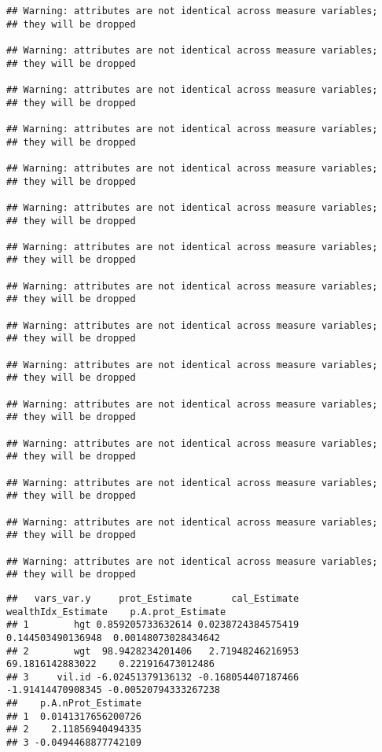 \documentclass[
]{book}
\begin{document}
\begin{verbatim}
## Warning: attributes are not identical across measure variables;
## they will be dropped

## Warning: attributes are not identical across measure variables;
## they will be dropped

## Warning: attributes are not identical across measure variables;
## they will be dropped

## Warning: attributes are not identical across measure variables;
## they will be dropped

## Warning: attributes are not identical across measure variables;
## they will be dropped

## Warning: attributes are not identical across measure variables;
## they will be dropped

## Warning: attributes are not identical across measure variables;
## they will be dropped

## Warning: attributes are not identical across measure variables;
## they will be dropped

## Warning: attributes are not identical across measure variables;
## they will be dropped

## Warning: attributes are not identical across measure variables;
## they will be dropped

## Warning: attributes are not identical across measure variables;
## they will be dropped

## Warning: attributes are not identical across measure variables;
## they will be dropped

## Warning: attributes are not identical across measure variables;
## they will be dropped

## Warning: attributes are not identical across measure variables;
## they will be dropped

## Warning: attributes are not identical across measure variables;
## they will be dropped
\end{verbatim}

\begin{verbatim}
##   vars_var.y     prot_Estimate       cal_Estimate wealthIdx_Estimate    p.A.prot_Estimate
## 1        hgt 0.859205733632614 0.0238724384575419  0.144503490136948  0.00148073028434642
## 2        wgt  98.9428234201406   2.71948246216953   69.1816142883022    0.221916473012486
## 3     vil.id -6.02451379136132 -0.168054407187466  -1.91414470908345 -0.00520794333267238
##    p.A.nProt_Estimate
## 1  0.0141317656200726
## 2    2.11856940494335
## 3 -0.0494468877742109
\end{verbatim}
\end{document}
